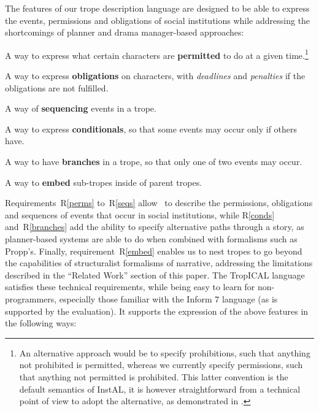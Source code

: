 The features of our trope description language are designed to be able to express the events, permissions and obligations of social institutions while addressing the shortcomings of planner and drama manager-based approaches:
\begin{compactenum}[R1.]
\item\label{perms} A way to express what certain characters are \textbf{permitted} to do at a given time.\footnote{An alternative approach would be to specify prohibitions, such that anything not prohibited is permitted, whereas we currently specify permissions, such that anything not permitted is prohibited.  This latter convention is the default semantics of InstAL, it is however straightforward from a technical point of view to adopt the alternative, as demonstrated in \cite{DBLP:conf/atal/KingLVDJPR15}.}
\item\label{obls} A way to express \textbf{obligations} on characters, with \emph{deadlines} and \emph{penalties} if the obligations are not fulfilled.
\item\label{seqs} A way of \textbf{sequencing} events in a trope.
\item\label{conds} A way to express \textbf{conditionals}, so that some events may occur only if others have.
\item\label{branches} A way to have \textbf{branches} in a trope, so that only one of two events may occur.
\item\label{embed} A way to \textbf{embed} sub-tropes inside of parent tropes.
\end{compactenum} %
Requirements~R\ref{perms} to~R\ref{seqs} allow \tropical\ to describe the permissions, obligations and sequences of events that occur in social institutions, while R\ref{conds} and~R\ref{branches} add the ability to specify alternative paths through a story, as planner-based systems are able to do when combined with formalisms such as Propp's. Finally, requirement~R\ref{embed} enables us to nest tropes to go beyond the capabilities of structuralist formalisms of narrative, addressing the limitations described in the ``Related Work'' section of this paper.  The TropICAL language satisfies these technical requirements, while being easy to learn for non-programmers, especially those familiar with the Inform 7 language (as is supported by the evaluation). It supports the expression of the above features in the following ways: 

